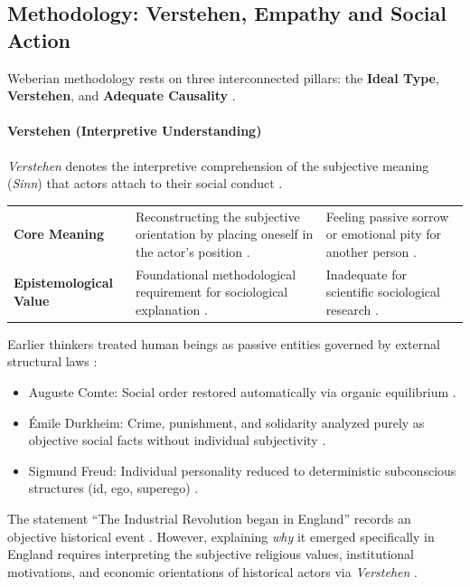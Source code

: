 \subsection{Methodology: Verstehen, Empathy and Social Action}

Weberian methodology rests on three interconnected pillars: the \textbf{Ideal Type}, \textbf{Verstehen}, and \textbf{Adequate Causality} .

\paragraph{Verstehen (Interpretive Understanding)}
\textit{Verstehen} denotes the interpretive comprehension of the subjective meaning (\textit{Sinn}) that actors attach to their social conduct .

\begin{table}[htbp]
\centering
\begin{tabularx}{\textwidth}{p{3.2cm} Y Y}
\hline
{}
 &  &  \\
\hline
\textbf{Core Meaning} & Reconstructing the subjective orientation by placing oneself in the actor's position . & Feeling passive sorrow or emotional pity for another person . \\
\textbf{Epistemological Value} & Foundational methodological requirement for sociological explanation . & Inadequate for scientific sociological research . \\
\hline
\end{tabularx}
\end{table}

\begin{CriticalPoint}
Earlier thinkers treated human beings as passive entities governed by external structural laws :
\begin{itemize}
    \item Auguste Comte: Social order restored automatically via organic equilibrium .
    \item \'Emile Durkheim: Crime, punishment, and solidarity analyzed purely as objective social facts without individual subjectivity .
    \item Sigmund Freud: Individual personality reduced to deterministic subconscious structures (id, ego, superego) .
\end{itemize}
\end{CriticalPoint}

\begin{ExampleBox}
The statement ``The Industrial Revolution began in England'' records an objective historical event . However, explaining \textit{why} it emerged specifically in England requires interpreting the subjective religious values, institutional motivations, and economic orientations of historical actors via \textit{Verstehen} .
\end{ExampleBox}

